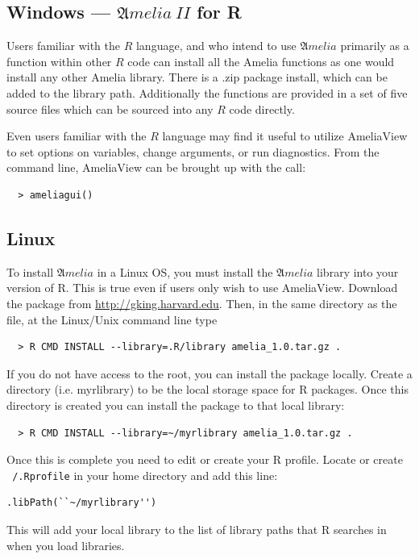 \documentclass[12pt,titlepage]{article}
\newcommand{\Amelia}{\ensuremath{\mathfrak Amelia} }
\newcommand{\AmeliaII}{\ensuremath{\mathfrak Amelia~II} }
\begin{document}
\subsection{Windows --- \AmeliaII for R}

Users familiar with the $R$ language, and who intend to use \Amelia
primarily as a function within other $R$ code can install all the
Amelia functions as one would install any other Amelia library.  There
is a .zip package install, which can be added to the library path.
Additionally the functions are provided in a set of five source files
which can be sourced into any $R$ code directly.

Even users familiar with the $R$ language may find it useful to
utilize AmeliaView to set options on variables, change arguments, or
run diagnostics.  From the command line, AmeliaView can be brought up
with the call:
  \begin{verbatim}
  > ameliagui()
  \end{verbatim}

\subsection{Linux}
\label{sec:lin-install}
To install ${\mathfrak Amelia}$ in a Linux OS, you must install the
${\mathfrak Amelia}$ library into your version of R.  This is true
even if users only wish to use AmeliaView.  Download the package from
\url{http://gking.harvard.edu}.  Then, in the same directory as the
file, at the Linux/Unix command line type
  \begin{verbatim}
  > R CMD INSTALL --library=.R/library amelia_1.0.tar.gz .
  \end{verbatim}
If you do not have access to the root, you can install the package
locally.  Create a directory (i.e. myrlibrary) to be the local storage
space for R packages.  Once this directory is created you can install
the package to that local library:
  \begin{verbatim}
  > R CMD INSTALL --library=~/myrlibrary amelia_1.0.tar.gz .
  \end{verbatim}
Once this is complete you need to edit or create your R profile.
Locate or create \texttt{~/.Rprofile} in your home directory and add
this line:
\begin{verbatim}
.libPath(``~/myrlibrary'')
\end{verbatim}
This will add your local library to the list of library paths that R
searches in when you load libraries.
\end{document}
